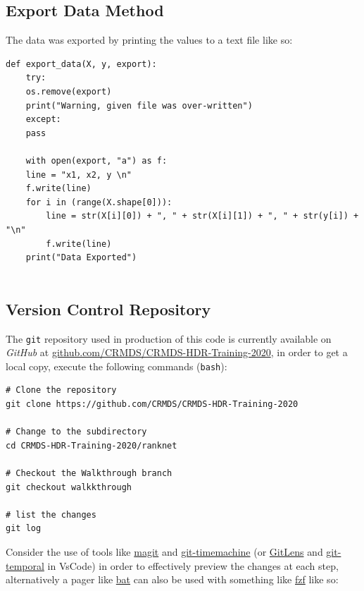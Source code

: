 \documentclass[a4paper,11pt,twoside]{article}
\begin{document}
\subsection{Export Data Method}
\label{sec:orgf937185}
The data was exported by printing the values to a text file like
so:

\begin{verbatim}
def export_data(X, y, export):
    try:
	os.remove(export)
	print("Warning, given file was over-written")
    except:
	pass

    with open(export, "a") as f:
	line = "x1, x2, y \n"
	f.write(line)
	for i in (range(X.shape[0])):
	    line = str(X[i][0]) + ", " + str(X[i][1]) + ", " + str(y[i]) + "\n"
	    f.write(line)
    print("Data Exported")


\end{verbatim}

\subsection{Version Control Repository}
\label{sec:orgd588b2a}
The \texttt{git} repository used in production of this code is currently
available on \emph{GitHub} at \href{https://github.com/CRMDS/CRMDS-HDR-Training-2020}{github.com/CRMDS/CRMDS-HDR-Training-2020}, in
order to get a local copy, execute the following commands (\texttt{bash}): 

\begin{verbatim}
# Clone the repository
git clone https://github.com/CRMDS/CRMDS-HDR-Training-2020

# Change to the subdirectory
cd CRMDS-HDR-Training-2020/ranknet

# Checkout the Walkthrough branch
git checkout walkkthrough

# list the changes
git log
\end{verbatim}

Consider the use of tools like \href{https://magit.vc/}{magit} \cite{MagitMagit2008} and
\href{https://github.com/emacsmirror/git-timemachine}{git-timemachine} \cite{peterstiernstromEmacsmirrorGittimemachine2014} (or
\href{https://marketplace.visualstudio.com/items?itemName=eamodio.gitlens}{GitLens} \cite{amodioEamodioVscodegitlens2016} and \href{https://marketplace.visualstudio.com/items?itemName=bee.git-temporal-vscode}{git-temporal}
\cite{beewilkersonGittemporalGittemporalMono2018} in VsCode) in order
to effectively preview the changes at each step, alternatively a
pager like \href{https://github.com/sharkdp/bat}{bat} \cite{peterSharkdpBat2018} can also be used with something like \href{https://github.com/junegunn/fzf}{fzf}
\cite{choiJunegunnFzf2021} like so:
\end{document}

